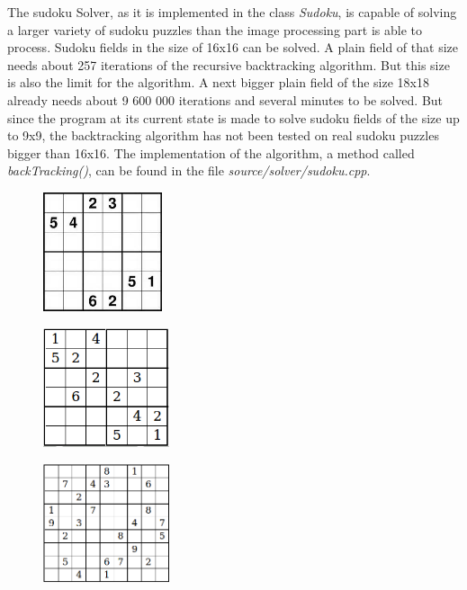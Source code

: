 \documentclass[
a4paper,     %
12pt         %
]{scrartcl}  %
\begin{document}
The sudoku Solver, as it is implemented in the class \emph{Sudoku}, is capable of solving a larger variety of 
sudoku puzzles than the image processing part is able to process. Sudoku fields in the size of 16x16 can be solved.
A plain field of that size needs about 257 iterations of the recursive backtracking algorithm. But this size is also the limit 
for the algorithm. A next bigger plain field of the size 18x18 already needs about 9 600 000 iterations and several 
minutes to be solved. But since the program at its current state is made to solve sudoku fields of the size up to 9x9, the 
backtracking algorithm has not been tested on real sudoku puzzles bigger than 16x16. The implementation of the algorithm, 
a method called \emph{backTracking()}, can be found in the file \emph{source/solver/sudoku.cpp}.
\begin{figure}[!bhp]
   \begin{center}
     \begin{minipage}[h]{3.8cm}
       \includegraphics[height=3.5cm]{imgs/6x6up.png}
       \label{fig:6x6up}
       \subcaption{}
     \end{minipage}
     \begin{minipage}[h]{3.8cm}
       \includegraphics[height=3.5cm]{imgs/solver_6x6.png}
       \label{fig:6x6}
       \subcaption{}
     \end{minipage}
     \begin{minipage}[h]{3.8cm}
       \includegraphics[height=3.5cm]{imgs/solver_9x9.png}

\end{minipage}
\end{center}
\end{figure}
\end{document}
